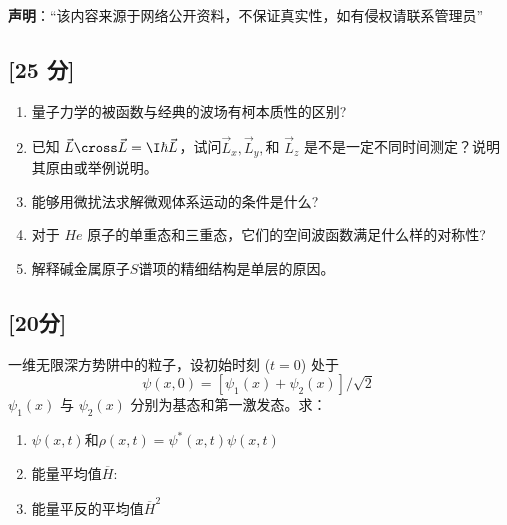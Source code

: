 
\textbf{声明}：“该内容来源于网络公开资料，不保证真实性，如有侵权请联系管理员”

\subsection{[25 分]}
\begin{enumerate}
\item 量子力学的被函数与经典的波场有柯本质性的区别?
\item 已知 $\vec L \cross \vec L = \I \hbar \vec L$，试问$\vec L_x, \vec L_y,$和 $\vec L_z$ 是不是一定不同时间测定？说明其原由或举例说明。
\item 能够用微扰法求解微观体系运动的条件是什么?
\item 对于 $He$ 原子的单重态和三重态，它们的空间波函数满足什么样的对称性?
\item 解释碱金属原子$S$谱项的精细结构是单层的原因。
\end{enumerate}
\subsection{[20分]}
一维无限深方势阱中的粒子，设初始时刻 ($t = 0$) 处于
\[
\psi(x, 0) = [\psi_1(x) + \psi_2(x)]/\sqrt{2}~
\]
$\psi_1(x)$ 与 $\psi_2(x)$ 分别为基态和第一激发态。求：
\begin{enumerate}
\item $\psi(x, t)$和$\rho(x,t) = \psi^*(x,t)\psi(x,t)$
\item 能量平均值$\overline{H} $:
\item 能量平反的平均值$\overline{H}^2 $
\end{enumerate}
